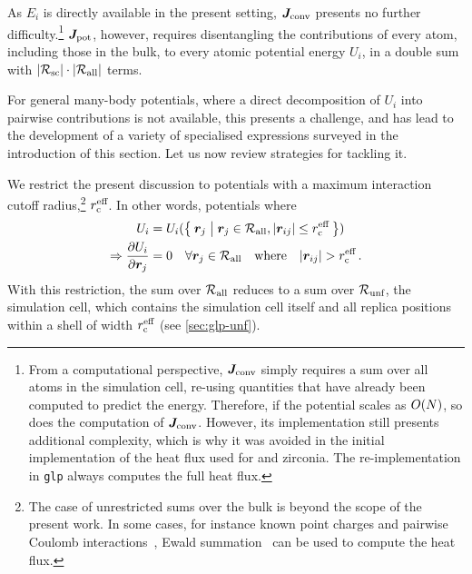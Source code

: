 As $E_i$ is directly available in the present setting, $\boldsymbol{J}_\text{conv}$ presents no further difficulty.\footnote{From a computational perspective, $\boldsymbol{J}_\text{conv}$ simply requires a sum over all atoms in the simulation cell, re-using quantities that have already been computed to predict the energy. Therefore, if the potential scales as $O(N)$, so does the computation of $\boldsymbol{J}_\text{conv}$. However, its implementation still presents additional complexity, which is why it was avoided in the initial implementation of the heat flux used for \schnet and zirconia. The re-implementation in \texttt{glp} always computes the full heat flux.}
$\boldsymbol{J}_\text{pot}$, however, requires disentangling the contributions of every atom, including those in the bulk, to every atomic potential energy $U_i$, in a double sum with $|\mathcal{R_{\text{sc}}}| \cdot |\mathcal{R_{\text{all}}}|$ terms.

For general many-body potentials, where a direct decomposition of $U_i$ into pairwise contributions is not available, this presents a challenge, and has lead to the development of a variety of specialised expressions surveyed in the introduction of this section.
Let us now review strategies for tackling it.

We restrict the present discussion to potentials with a maximum interaction cutoff radius,\footnote{The case of unrestricted sums over the bulk is beyond the scope of the present work. In some cases, for instance known point charges and pairwise Coulomb interactions~\cite{gce2004t}, Ewald summation~\cite{e1921p} can be used to compute the heat flux.} $r_{\text{c}}^{\text{eff}}$. 
In other words, potentials where
\begin{align}
	U_i &= U_i(\curlyset{\R_j}{\R_j \in \Rall, \magnitude{\R_{ij}} \leq \effcutoff}) \\
	\Rightarrow \dur{i}{j}{} &= 0 \quad \forall \R_j \in \Rall \quad \text{where} \quad \magnitude{\R_{ij}} > \effcutoff \, . \label{eq:hf_u_effcutoff}
\end{align}
With this restriction, the sum over $\mathcal{R_{\text{all}}}$ reduces to a sum over $\mathcal{R_{\text{unf}}}$, the  simulation cell, which contains the simulation cell itself and all replica positions within a shell of width $r_{\text{c}}^{\text{eff}}$ (see \cref{sec:glp-unf}).

